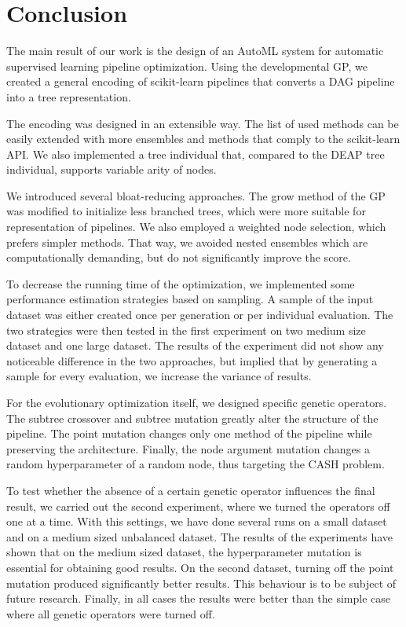 \chapter*{Conclusion}

The main result of our work is the design of an AutoML system for automatic
supervised learning pipeline optimization. Using the developmental GP, we created a general encoding
of scikit-learn pipelines that converts a DAG pipeline into a tree representation.

The encoding was designed in an extensible way. The list of used methods can be easily 
extended with more ensembles and methods that comply to the scikit-learn API.
We also implemented a tree individual that, compared to the DEAP tree individual, supports
variable arity of nodes.

We introduced several bloat-reducing approaches. The grow method of the GP was
modified to initialize less branched trees, which were more suitable for representation
of pipelines. We also employed a weighted node selection, which prefers simpler methods.
That way, we avoided nested ensembles which are computationally demanding, but do not
significantly improve the score. 

To decrease the running time of the optimization, we implemented some performance
estimation strategies based on sampling. A sample of the input dataset was either
created once per generation or per individual evaluation. The two strategies were
then tested in the first experiment on two medium size dataset and one large dataset.
The results of the experiment did not show any noticeable difference in
the two approaches, but implied that by generating a sample for every evaluation, we
increase the variance of results.

For the evolutionary optimization itself, we designed specific genetic operators. The
subtree crossover and subtree mutation greatly alter the structure of the pipeline.
The point mutation changes only one method of the pipeline while preserving the
architecture. Finally, the node argument mutation changes a random hyperparameter of
a random node, thus targeting the CASH problem.

To test whether the absence of a certain genetic operator influences the final result,
we carried out the second experiment, where we turned the operators off one at a time.
With this settings, we have done several runs on a small dataset and on a medium sized
unbalanced dataset. The results of the experiments have shown that on the medium
sized dataset, the hyperparameter mutation is essential for obtaining good results.
On the second dataset, turning off the point mutation produced significantly better
results. This behaviour is to be subject of future research. Finally, in all cases
the results were better than the simple case where all genetic operators were turned
off.

